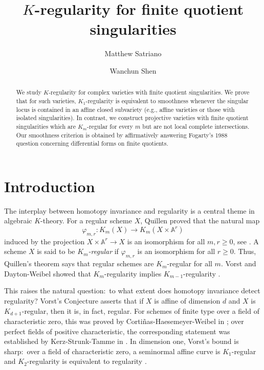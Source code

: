 \documentclass{amsart}
\title{$K$-regularity for finite quotient singularities}
\date{}
\author{Matthew Satriano}
\author{Wanchun Shen}
\theoremstyle{definition}
\begin{document}
\begin{abstract}
    We study $K$-regularity for complex varieties with finite quotient singularities. We prove that for such varieties, $K_1$-regularity is equivalent to smoothness whenever the singular locus is contained in an affine closed subvariety (e.g., affine varieties or those with isolated singularities). In contrast, we construct projective varieties with finite quotient singularities which are $K_m$-regular for every $m$ but are not local complete intersections. Our smoothness criterion is obtained by affirmatively answering Fogarty's 1988 question concerning differential forms on finite quotients.
\end{abstract}
\maketitle





\section{Introduction}
The interplay between homotopy invariance and regularity is a central theme in algebraic $K$-theory. For a regular scheme $X$, Quillen proved that the natural map
\[\varphi_{m,r}:K_m(X)\to K_m(X\times \mathbb{A}^r)\]
induced by the projection $X\times \mathbb{A}^r\to X$ is an isomorphism for all $m, r\ge 0$, see \cite[\S4 Theorem 3 Corollary 2 and \S7 Proposition 4.1]{Quillen1973}. A scheme $X$ is said to be \textit{$K_m$-regular} if $\varphi_{m,r}$ is an isomorphism for all $r\ge 0$. Thus, Quillen's theorem says that regular schemes are $K_m$-regular for all $m$. Vorst and Dayton-Weibel showed that $K_m$-regularity implies $K_{m-1}$-regularity \cite{Vorst1979,Dayton1980}.

This raises the natural question:~to what extent does homotopy invariance detect regularity? Vorst's Conjecture \cite{Vorst1979} asserts that if $X$ is affine of dimension $d$ and $X$ is $K_{d+1}$-regular, then it is, in fact, regular. For schemes of finite type over a field of characteristic zero, this was proved by Cortiñas-Haesemeyer-Weibel in \cite{Cortinas2007}; over perfect fields of positive characteristic, the corresponding statement was established by Kerz-Strunk-Tamme in \cite{Kerz2021}. In dimension one, Vorst's bound is sharp:~over a field of characteristic zero, a seminormal affine curve is $K_1$-regular \cite[Theorem~A]{VorstK1} and $K_2$-regularity is equivalent to regularity \cite[Theorem~3.6]{Vorst1979}.
\end{document}
